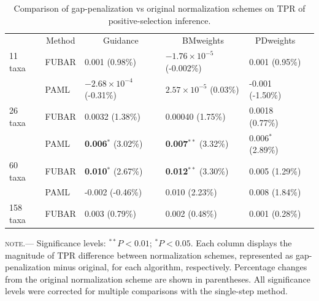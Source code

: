 \documentclass[10pt]{article}
\begin{document}
\begin{table}[H]
\caption {\label{tab:penalmodel} Comparison of gap-penalization vs original normalization schemes on TPR of positive-selection inference.}
\begin{tabular}{l l l l l l}
\hline\noalign{\smallskip}
\multicolumn{1}{c}{Simulation Set} & \multicolumn{1}{c}{Method} & \multicolumn{1}{c}{Guidance} & \multicolumn{1}{c}{BMweights} & \multicolumn{1}{c}{PDweights} \\
\noalign{\smallskip}\hline\noalign{\smallskip}
11 taxa  & FUBAR & 0.001 (0.98\%) & $-1.76\times10^{-5}$ (-0.002\%) & 0.001 (0.95\%)\\
              & PAML & $-2.68\times10^{-4}$ (-0.31\%) & $2.57\times10^{-5}$ (0.03\%) & -0.001 (-1.50\%)\\
\hline
26 taxa   & FUBAR & 0.0032 (1.38\%) & 0.00040 (1.75\%) & 0.0018 (0.77\%)\\
              & PAML & \textbf{0.006}$^{\ast}$ (3.02\%) & \textbf{0.007}$^{\ast\ast}$ (3.32\%) & 0.006$^{\ast}$ (2.89\%) \\
\hline
60 taxa  & FUBAR & \textbf{0.010}$^{\ast}$ (2.67\%) & \textbf{0.012}$^{\ast\ast}$ (3.30\%)  & 0.005  (1.29\%)\\
              & PAML & -0.002 (-0.46\%) & 0.010 (2.23\%) & 0.008 (1.84\%) \\
\hline
158 taxa & FUBAR & 0.003 (0.79\%) & 0.002 (0.48\%) & 0.001 (0.28\%)\\
\hline
\end{tabular}
\newline
\textsc{note.}--- Significance levels: $^{\ast\ast} P < 0.01$; $^{\ast} P < 0.05$. Each column displays the magnitude of TPR difference between normalization schemes, represented as gap-penalization minus original, for each algorithm, respectively. Percentage changes from the original normalization scheme are shown in parentheses. All significance levels were corrected for multiple comparisons with the single-step method.
\end{table}
\end{document}
